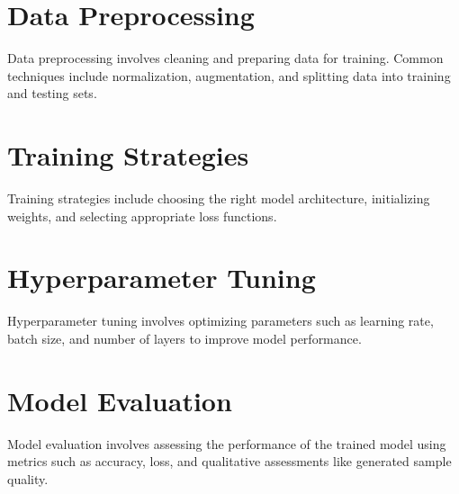\section{Data Preprocessing}
Data preprocessing involves cleaning and preparing data for training. Common techniques include normalization, augmentation, and splitting data into training and testing sets.

\section{Training Strategies}
Training strategies include choosing the right model architecture, initializing weights, and selecting appropriate loss functions.

\section{Hyperparameter Tuning}
Hyperparameter tuning involves optimizing parameters such as learning rate, batch size, and number of layers to improve model performance.

\section{Model Evaluation}
Model evaluation involves assessing the performance of the trained model using metrics such as accuracy, loss, and qualitative assessments like generated sample quality.
